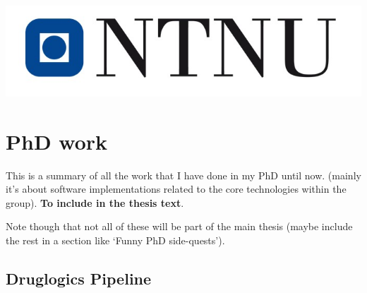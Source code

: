\documentclass[
  12pt,
]{book}
\begin{document}
\begin{center}\includegraphics[width=0.5\linewidth]{img/NTNU-logo} \end{center}

\hypertarget{phd-work}{%
\chapter{PhD work}\label{phd-work}}

This is a summary of all the work that I have done in my PhD until now.
(mainly it's about software implementations related to the core technologies
within the group). \textbf{To include in the thesis text}.

Note though that not all of these will be part of the main thesis (maybe include the
rest in a section like `Funny PhD side-quests').

\hypertarget{druglogics-pipeline}{%
\section*{Druglogics Pipeline}\label{druglogics-pipeline}}
\end{document}
